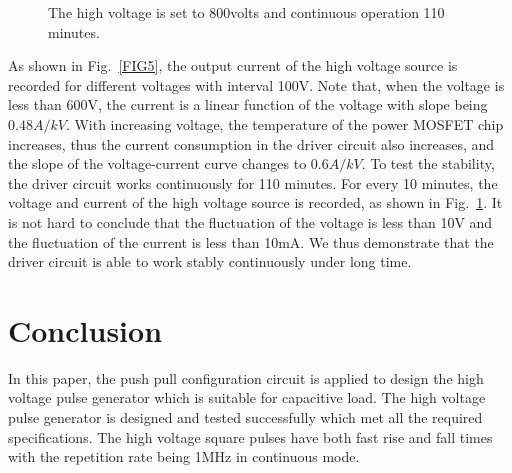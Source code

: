 \documentclass[aip,rsi,reprint,graphicx]{revtex4-1} %
\begin{document}
\begin{figure}
\caption{The high voltage is set to 800volts and continuous operation 110 minutes.\label{Fig6}}%
\end{figure}
As shown in Fig.~\ref{FIG5}, the output current of the high voltage source is recorded for different voltages with interval 100V. Note that, when the voltage is less than 600V, the current is a linear function of the voltage with slope being $0.48A/kV$. With increasing voltage, the temperature of the power MOSFET chip increases, thus the current consumption in the driver circuit also increases, and the slope of the voltage-current curve changes to $0.6A/kV$.
To test the stability, the driver circuit works continuously for 110 minutes. For every 10 minutes, the voltage and current of the high voltage source is recorded, as shown in Fig.~\ref{Fig6}. It is not hard to conclude that the fluctuation of the voltage is less than 10V and the fluctuation of the current is less than 10mA. We thus demonstrate that the driver circuit is able to work stably continuously under long time.

\section{Conclusion}
In this paper, the push pull configuration circuit is applied to design the high voltage pulse generator which is suitable for capacitive load. The high voltage pulse generator is designed and tested successfully which met all the required specifications. The high voltage square pulses have both fast rise and fall times with the repetition rate being 1MHz in continuous mode.


%
%
\end{document}
